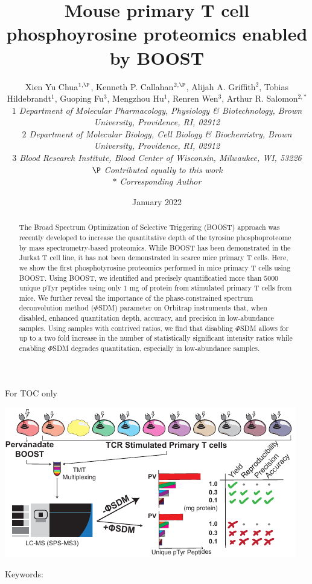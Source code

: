 \documentclass[journal=jprobs,manuscript=article]{achemso}
\title{Mouse primary T cell phosphoyrosine proteomics enabled by BOOST}
\author{Xien Yu Chua$^{1,\P}$, Kenneth P. Callahan$^{2,\P}$, Alijah A. Griffith$^{2}$, Tobias Hildebrandt$^{1}$, Guoping Fu$^{3}$, Mengzhou Hu$^{1}$, Renren Wen$^{3}$, Arthur R. Salomon$^{2,*}$
\\
\singlespacing
\textit{\small{$1$ Department of Molecular Pharmacology, Physiology \& Biotechnology, Brown University, Providence, RI, 02912}}
\\
\textit{\small{$2$ Department of Molecular Biology, Cell Biology \& Biochemistry, Brown University, Providence, RI, 02912}}
\\
\textit{\small{$3$ Blood Research Institute, Blood Center of Wisconsin, Milwaukee, WI, 53226}}
\\
\textit{\small{$\P$ Contributed equally to this work}}
\\
\textit{\small{$*$} Corresponding Author}\tiny}
\date{January 2022}
\begin{document}
\maketitle

\begin{tocentry}

For TOC only

\includegraphics{figures/graphical_toc/mouse_turbotmt_gtoc.pdf}
\end{tocentry}


\begin{abstract}

The Broad Spectrum Optimization of Selective Triggering (BOOST) approach was recently developed to increase the quantitative depth of the tyrosine phosphoproteome by mass spectrometry-based proteomics. While BOOST has been demonstrated in the Jurkat T cell line, it has not been demonstrated in scarce mice primary T cells. Here, we show the first phosphotyrosine proteomics performed in mice primary T cells using BOOST. Using BOOST, we identified and precisely quantificatied more than $5000$ unique pTyr peptides using only $1$ mg of protein from stimulated primary T cells from mice. We further reveal the importance of the phase-constrained spectrum deconvolution method ($\Phi$SDM) parameter on Orbitrap instruments that, when disabled, enhanced quantitation depth, accuracy, and precision in low-abundance samples. Using samples with contrived ratios, we find that disabling $\Phi$SDM allows for up to a two fold increase in the number of statistically significant intensity ratios while enabling $\Phi$SDM degrades quantitation, especially in low-abundance samples.


\end{abstract}

Keywords:
\end{document}
